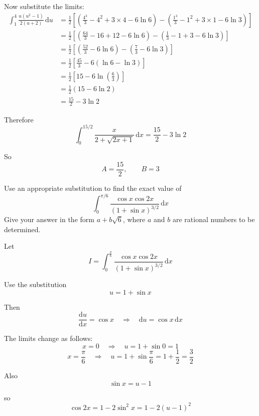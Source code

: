 \documentclass[leqno]{article}
\begin{document}
\begin{enumerate}[
  label=\textbf{\arabic*.},
  leftmargin=*,
  topsep=0pt,
  partopsep=0pt,
  parsep=0pt
]
\begin{djsSolution}
\begin{enumerate}[label=\textbf{(\alph*)}]
  Now substitute the limits:
  \begin{align*}
  \int_1^4 \frac{u(u^2-1)}{2(u+2)}\,\mathrm{d}u
  &=\frac12\left[\left(\frac{4^3}{3}-4^2+3\times4-6\ln6\right)-\left(\frac{1^3}{3}-1^2+3\times1-6\ln3\right)\right]\\
  &=\frac12\left[\left(\frac{64}{3}-16+12-6\ln6\right)-\left(\frac13-1+3-6\ln3\right)\right]\\
  &=\frac12\left[\left(\frac{52}{3}-6\ln6\right)-\left(\frac73-6\ln3\right)\right]\\
  &=\frac12\left[\frac{45}{3}-6(\ln6-\ln3)\right]\\
  &=\frac12\left[15-6\ln\left(\frac63\right)\right]\\
  &=\frac12\left(15-6\ln2\right)\\
  &=\frac{15}{2}-3\ln2
  \end{align*}

  Therefore
  \[
  \int_0^{15/2}\frac{x}{2+\sqrt{2x+1}}\,\mathrm{d}x=\frac{15}{2}-3\ln2
  \]

  So
  \[
  A=\frac{15}{2}, \qquad B=3
  \]
\end{enumerate}
\end{djsSolution}


\newpage

\questionitem

Use an appropriate substitution to find the exact value of
\[
\int_0^{\pi/6} \frac{\cos x\cos 2x}{(1 + \sin x)^{3/2}}\,\mathrm{d}x
\]
Give your answer in the form $a+b\sqrt{6}$, where $a$ and $b$ are rational numbers to be determined.  \\

\vspace*{10pt}

\begin{djsSolution}
Let
\[
I=\int_0^{\frac{\pi}{6}} \frac{\cos x\cos 2x}{(1+\sin x)^{3/2}}\,\mathrm{d}x
\]

Use the substitution
\[
u=1+\sin x
\]

Then
\[
\frac{\mathrm{d}u}{\mathrm{d}x}=\cos x
\quad\Longrightarrow\quad
\mathrm{d}u=\cos x\,\mathrm{d}x
\]

The limits change as follows:
\[
x=0\quad\Longrightarrow\quad u=1+\sin 0=1
\]
\[
x=\frac{\pi}{6}\quad\Longrightarrow\quad u=1+\sin\frac{\pi}{6}=1+\frac12=\frac32
\]

Also
\[
\sin x=u-1
\]

so
\[
\cos 2x=1-2\sin^2 x=1-2(u-1)^2
\]


\end{djsSolution}
\end{enumerate}
\end{document}
